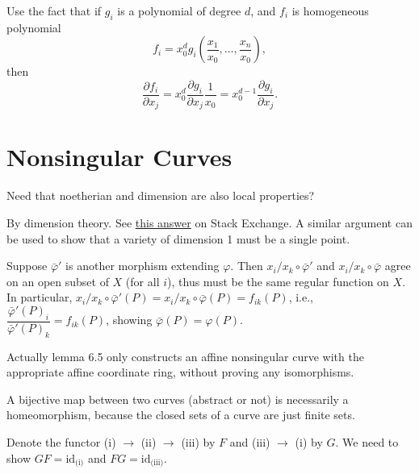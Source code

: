 \documentclass{note}
\newcommand{\id}{\mathrm{id}}
\begin{document}
Use the fact that if $g_i$ is a polynomial of degree $d$, and $f_i$ is
homogeneous polynomial
\begin{equation*}
  f_i = x_0^d g_i\left(\frac{x_1}{x_0}, \dots, \frac{x_n}{x_0}\right),
\end{equation*}
then
\begin{equation*}
  \frac{\partial f_i}{\partial x_j}
  = x_0^d\frac{\partial g_i}{\partial x_j}\frac{1}{x_0}
  = x_0^{d-1}\frac{\partial g_i}{\partial x_j}.
\end{equation*}

\section{Nonsingular Curves}
Need that noetherian and dimension are also local properties?

By dimension theory. See
\href{https://math.stackexchange.com/questions/140592/closed-proper-subvarieties-of-curves-are-finite-sets-of-points}
{this answer} on Stack Exchange. A similar argument can be used to
show that a variety of dimension 1 must be a single point.

Suppose $\bar\varphi'$ is another morphism extending $\varphi$. Then
$x_i/x_k\circ\bar\varphi'$ and $x_i/x_k\circ\bar\varphi$ agree on an
open subset of $X$ (for all $i$), thus must be the same regular
function on $X$. In particular,
$x_i/x_k\circ\bar\varphi'(P) = x_i/x_k\circ\bar\varphi(P) =
f_{ik}(P)$, i.e.,
$\dfrac{\bar\varphi'(P)_i}{\bar\varphi'(P)_k} = f_{ik}(P)$, showing
$\bar\varphi(P) = \varphi(P)$.

Actually lemma 6.5 only constructs an affine nonsingular curve with
the appropriate affine coordinate ring, without proving any
isomorphisms.

A bijective map between two curves (abstract or not) is necessarily a
homeomorphism, because the closed sets of a curve are just finite
sets.

Denote the functor (i) $\to$ (ii) $\to$ (iii) by $F$ and (iii) $\to$
(i) by $G$. We need to show $GF=\id_{\text{(i)}}$ and
$FG=\id_{\text{(iii)}}$.
\end{document}
